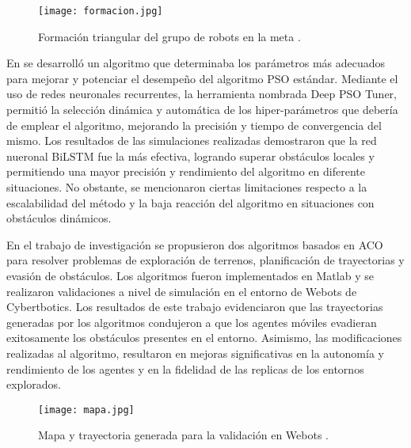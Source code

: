 \begin{figure}[H]
	\centering
	\texttt{[image: formacion.jpg]}
	\caption{Formación triangular del grupo de robots en la meta \cite{pena_echeverria_algoritmo_2019}.}
	\label{fig2_4}
\end{figure}

En \cite{santizo_olivet_aprendizaje_2021} se desarrolló un algoritmo que determinaba los parámetros más adecuados para mejorar y potenciar el desempeño del algoritmo PSO estándar. Mediante el uso de redes neuronales recurrentes, la herramienta nombrada Deep PSO Tuner, permitió la selección dinámica y automática de los hiper-parámetros que debería de emplear el algoritmo, mejorando la precisión y tiempo de convergencia del mismo. Los resultados de las simulaciones realizadas demostraron que la red nueronal BiLSTM fue la más efectiva, logrando superar obstáculos locales y permitiendo una mayor precisión y rendimiento del algoritmo en diferente situaciones. No obstante, se mencionaron ciertas limitaciones respecto a la escalabilidad del método y la baja reacción del algoritmo en situaciones con obstáculos dinámicos.

En el trabajo de investigación \cite{baldizon_garcia_aplicaciones_2022} se propusieron dos algoritmos basados en ACO para resolver problemas de exploración de terrenos, planificación de trayectorias y evasión de obstáculos. Los algoritmos fueron implementados en Matlab y se realizaron validaciones a nivel de simulación en el entorno de Webots de Cybertbotics. Los resultados de este trabajo evidenciaron que las trayectorias generadas por los algoritmos condujeron a que los agentes móviles evadieran exitosamente los obstáculos presentes en el entorno. Asimismo, las modificaciones realizadas al algoritmo, resultaron en mejoras significativas en la autonomía y rendimiento de los agentes y en la fidelidad de las replicas de los entornos explorados.
\begin{figure}[H]
	\centering
	\texttt{[image: mapa.jpg]}
	\caption{Mapa y trayectoria generada para la validación en Webots \cite{baldizon_garcia_aplicaciones_2022}.}
	\label{fig2_5}
\end{figure}

